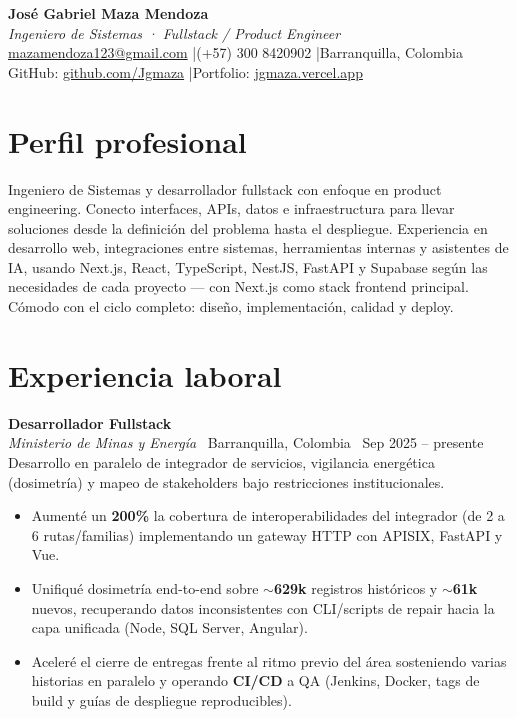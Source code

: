 \documentclass[10.5pt,a4paper]{article}
\newcommand{\Job}[4]{%
  \noindent\textbf{#1}\\[-0.05em]
  {\small\textit{#2} \textbar\ #4 \textbar\ #3}\\[0.15em]
}
\begin{document}
\begin{center}
  {\LARGE\bfseries José Gabriel Maza Mendoza}\\[0.25em]
  {\large\textit{Ingeniero de Sistemas · Fullstack / Product Engineer}}\\[0.45em]
  {\small
    \href{mailto:mazamendoza123@gmail.com}{mazamendoza123@gmail.com}
    \quad|\quad (+57) 300 8420902
    \quad|\quad Barranquilla, Colombia
  }\\[0.15em]
  {\small
    GitHub: \href{https://github.com/Jgmaza}{github.com/Jgmaza}
    \quad|\quad Portfolio: \href{https://jgmaza.vercel.app}{jgmaza.vercel.app}
  }
\end{center}

\section{Perfil profesional}
Ingeniero de Sistemas y desarrollador fullstack con enfoque en product engineering.
Conecto interfaces, APIs, datos e infraestructura para llevar soluciones desde la
definición del problema hasta el despliegue. Experiencia en desarrollo web,
integraciones entre sistemas, herramientas internas y asistentes de IA, usando
Next.js, React, TypeScript, NestJS, FastAPI y Supabase según las necesidades de
cada proyecto --- con Next.js como stack frontend principal. Cómodo con el ciclo
completo: diseño, implementación, calidad y deploy.

\section{Experiencia laboral}

\Job{Desarrollador Fullstack}{Ministerio de Minas y Energía}{Sep 2025 -- presente}{Barranquilla, Colombia}
Desarrollo en paralelo de integrador de servicios, vigilancia energética (dosimetría) y
mapeo de stakeholders bajo restricciones institucionales.
\begin{itemize}
  \item Aumenté un \textbf{200\%} la cobertura de interoperabilidades del integrador
        (de 2 a 6 rutas/familias) implementando un gateway HTTP con APISIX, FastAPI y Vue.
  \item Unifiqué dosimetría end-to-end sobre $\sim$\textbf{629k} registros históricos y
        $\sim$\textbf{61k} nuevos, recuperando datos inconsistentes con CLI/scripts de
        repair hacia la capa unificada (Node, SQL Server, Angular).
  \item Aceleré el cierre de entregas frente al ritmo previo del área sosteniendo varias
        historias en paralelo y operando \textbf{CI/CD} a QA (Jenkins, Docker, tags de
        build y guías de despliegue reproducibles).
\end{itemize}
\end{document}
